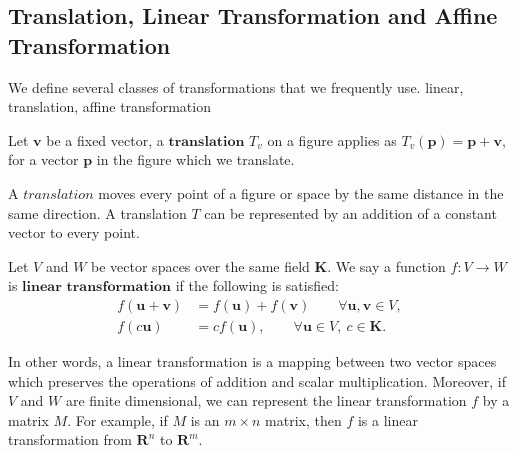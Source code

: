    \subsection{Translation, Linear Transformation and Affine Transformation}
      
      We define several classes of transformations that we frequently use.
      linear, translation, affine transformation\\
      
      \begin{definition*}
         Let $\textbf{v}$ be a fixed vector, a $\textbf{translation}$ ${T}_v$ on a figure applies as ${T}_v (\textbf{p}) = \textbf{p} + \textbf{v}$, for a vector $\textbf{p}$ in the figure which we translate.
      \end{definition*}
      A $\textit{translation}$ moves every point of a figure or space by the same distance in the same direction. A translation ${T}$ can be represented by an addition of a constant vector to every point.\\


      \begin{definition*}
      Let ${V}$ and ${W}$ be vector spaces over the same field $\textbf{K}$. We say a function $\mathit{f}: {V} \rightarrow {W}$ is $\textbf{linear transformation}$ if the following is satisfied:\\
      \begin{align*}
      \mathit{f}(\textbf{u} + \textbf{v}) &= \mathit{f}(\textbf{u}) + \mathit{f}(\textbf{v}) \qquad \forall \textbf{u}, \textbf{v} \in{V},\\
      \mathit{f}(c\textbf{u}) &= c\mathit{f}(\textbf{u}), \qquad \forall \textbf{u} \in{V}, ~c\in\textbf{K}.
      \end{align*}
      \end{definition*}
      In other words, a linear transformation is a mapping between two vector spaces which preserves the operations of addition and scalar multiplication. Moreover, if ${V}$ and ${W}$ are finite dimensional, we can represent the linear transformation ${f}$ by a matrix ${M}$. For example, if ${M}$ is an ${m} \times {n}$ matrix, then ${f}$ is a linear transformation from $\mathbf{R}^n$ to $\mathbf{R}^m$. \\


